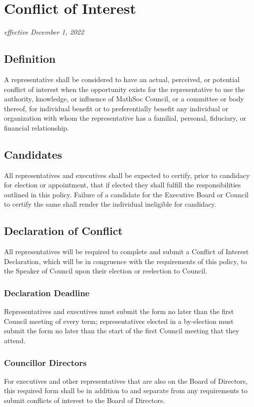 \section{Conflict of Interest}
\emph{effective December 1, 2022}

\subsection{Definition}
A representative shall be considered to have an actual, perceived, or potential conflict of interest when the opportunity exists for the representative to use the authority, knowledge, or influence of MathSoc Council, or a committee or body thereof, for individual benefit or to preferentially benefit any individual or organization with whom the representative has a familial, personal, fiduciary, or financial relationship.

\subsection{Candidates}
All representatives and executives shall be expected to certify, prior to candidacy for election or appointment, that if elected they shall fulfill the responsibilities outlined in this policy. Failure of a candidate for the Executive Board or Council to certify the same shall render the individual ineligible for candidacy.

\subsection{Declaration of Conflict}
All representatives will be required to complete and submit a Conflict of Interest Declaration, which will be in congruence with the requirements of this policy, to the Speaker of Council upon their election or reelection to Council. 

\subsubsection{Declaration Deadline}
Representatives and executives must submit the form no later than the first Council meeting of every term; representatives elected in a by-election must submit the form no later than the start of the first Council meeting that they attend.

\subsubsection{Councillor Directors}
For executives and other representatives that are also on the Board of Directors, this required form shall be in addition to and separate from any requirements to submit conflicts of interest to the Board of Directors.

